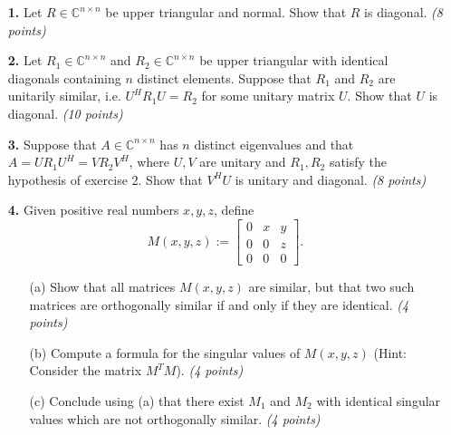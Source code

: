 \documentclass[18pt]{report}
\begin{document}
\begin{enumerate}
  \item[\textbf{1.}] Let $R\in\mathbb{C}^{n\times n}$ be upper triangular and normal. Show that $R$ is  diagonal. \textit{(8 points)}


\vspace{0.7cm}



  \item[\textbf{2.}] Let $R_1\in\mathbb{C}^{n\times n}$ and
    $R_2\in\mathbb{C}^{n\times n}$ be upper triangular with identical diagonals
    containing $n$ distinct elements. Suppose that $R_1$ and $R_2$ are 
    unitarily similar, i.e. $U^HR_1U = R_2$ for some unitary matrix $U$.
    Show that $U$ is diagonal. \textit{(10 points)}



\vspace{0.7cm}

  \item[\textbf{3.}] Suppose that $A \in \mathbb{C}^{n \times n}$ has $n$ distinct eigenvalues and
    that $A = U R_1 U^H = V R_2 V^H$, where $U,V$ are unitary and $R_1, R_2$ satisfy the hypothesis of exercise 2. Show that $V^H U$ is unitary and
    diagonal. \textit{(8 points)}


\vspace{0.7cm}


  \item[\textbf{4.}] Given positive real numbers $x,y,z$, define   \[M(x,y,z):=\left[\begin{array}{ccc}0&x&y\\0&0&z\\0&0&0\end{array}\right].\]
    \begin{enumerate}
      \item[(a)] Show that all matrices $M(x,y,z)$ are similar, but that two
         such matrices are orthogonally similar if and only if they are identical. \textit{(4 points)}

      \item[(b)] Compute a formula for the singular values of $M(x,y,z)$ (Hint: Consider the matrix $M^T M$). \linebreak\textit{(4 points)}
      \item[(c)] Conclude using (a) that there exist $M_1$ and $M_2$ with
        identical singular values which are not orthogonally similar. \textit{(4 points)} 
      \end{enumerate}
 

\end{enumerate}
\end{document}
